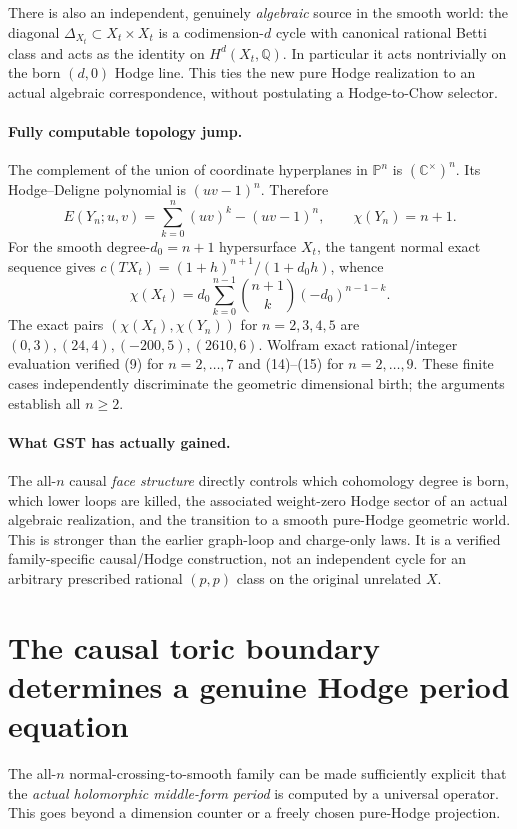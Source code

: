 \documentclass[11pt]{article}
\begin{document}
There is also an independent, genuinely \emph{algebraic}
source in the smooth world: the diagonal
$\Delta_{X_t}\subset X_t\times X_t$ is a codimension-$d$
cycle with canonical rational Betti class and acts
as the identity on $H^d(X_t,\mathbb Q)$. In particular
it acts nontrivially on the born $(d,0)$ Hodge line.
This ties the new pure Hodge realization to an actual
algebraic correspondence, without postulating a
Hodge-to-Chow selector.

\paragraph{Fully computable topology jump.}
The complement of the union of coordinate hyperplanes
in $\mathbb P^n$ is $(\mathbb C^\times)^n$. Its
Hodge--Deligne polynomial is $(uv-1)^n$. Therefore
\[
\boxed{\quad
 E(Y_n;u,v)=\sum_{k=0}^{n}(uv)^k-(uv-1)^n,
 \qquad \chi(Y_n)=n+1.
\quad}\tag{14}
\]
For the smooth degree-$d_0=n+1$ hypersurface $X_t$,
the tangent normal exact sequence gives
$c(TX_t)=(1+h)^{n+1}/(1+d_0h)$, whence
\[
\boxed{\quad
 \chi(X_t)=d_0\sum_{k=0}^{n-1}
  \binom{n+1}{k}(-d_0)^{n-1-k}.
\quad}\tag{15}
\]
The exact pairs $(\chi(X_t),\chi(Y_n))$ for
$n=2,3,4,5$ are $(0,3),(24,4),(-200,5),(2610,6)$.
Wolfram exact rational/integer evaluation verified
(9) for $n=2,\ldots,7$ and (14)--(15) for
$n=2,\ldots,9$. These finite cases independently
discriminate the geometric dimensional birth; the
arguments establish all $n\ge2$.

\paragraph{What GST has actually gained.}
The all-$n$ causal \emph{face structure} directly
controls which cohomology degree is born, which
lower loops are killed, the associated weight-zero
Hodge sector of an actual algebraic realization,
and the transition to a smooth pure-Hodge
geometric world. This is stronger than the earlier
graph-loop and charge-only laws. It is a verified
family-specific causal/Hodge construction, not an
independent cycle for an arbitrary prescribed
rational $(p,p)$ class on the original unrelated $X$.


\section{The causal toric boundary determines a genuine Hodge period equation}

The all-$n$ normal-crossing-to-smooth family can be made sufficiently
explicit that the \emph{actual holomorphic middle-form period} is
computed by a universal operator.  This goes beyond a dimension
counter or a freely chosen pure-Hodge projection.
\end{document}
